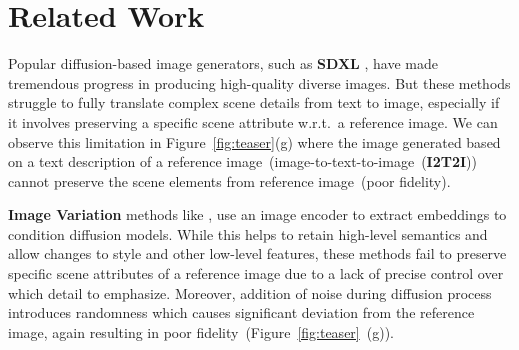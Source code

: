 \section{Related Work}
\vspace{-2mm}
\label{sec:related}
Popular diffusion-based image generators, such as \textbf{SDXL} \citep{podell2023sdxl}, have made tremendous progress in producing high-quality diverse images. But these methods struggle to fully translate complex scene details from text to image, especially if it involves preserving a specific scene attribute w.r.t.~a reference image. We can observe this limitation in Figure~\ref{fig:teaser}(g) where the image generated based on a text description of a reference image~(image-to-text-to-image~(\textbf{I2T2I})) cannot preserve the scene elements from reference image~(poor fidelity). 


\textbf{Image Variation} methods like \citet{xu2023versatile, feng2023diverse, zhang2024real, le2024brush, graikos2024learned, belagali2024gen}, use an image encoder to extract embeddings to condition diffusion models. While this helps to retain high-level semantics and allow changes to style and other low-level features, these methods fail to preserve specific scene attributes of a reference image due to a lack of precise control over which detail to emphasize. Moreover, addition of noise during diffusion process introduces randomness which causes significant deviation from the reference image, again resulting in poor fidelity~(Figure~\ref{fig:teaser}~(g)).



